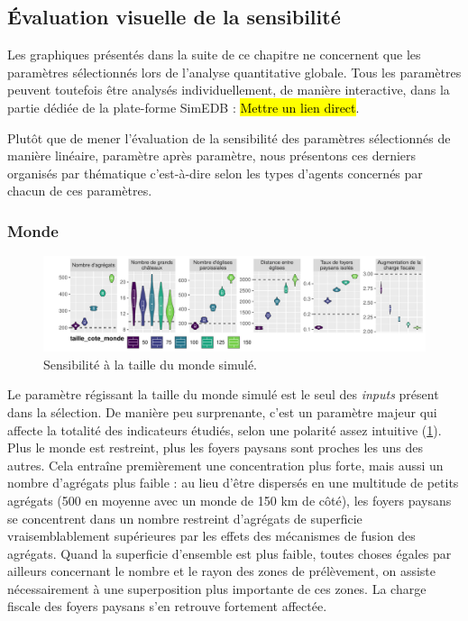 \subsection{Évaluation visuelle de la sensibilité}

\bigskip
\begin{mdframed}[backgroundcolor=black!5,footnoteinside=false]
	Les graphiques présentés dans la suite de ce chapitre ne concernent que les paramètres sélectionnés lors de l'analyse quantitative globale.
	Tous les paramètres peuvent toutefois être analysés individuellement, de manière interactive, dans la partie dédiée de la plate-forme SimEDB : \hl{Mettre un lien direct}.
\end{mdframed}

Plutôt que de mener l'évaluation de la sensibilité des paramètres sélectionnés de manière linéaire, paramètre après paramètre, nous présentons ces derniers organisés par thématique c'est-à-dire selon les types d'agents concernés par chacun de ces paramètres.

\subsubsection{Monde}

\begin{figure}[H]
	\centering
	\includegraphics[width=\linewidth]{img/sensib/sensibilite_taille_cote_monde.pdf}
	\caption{Sensibilité à la taille du monde simulé.}
	\label{fig:sensib-monde}
\end{figure}

Le paramètre régissant la taille du monde simulé est le seul des \textit{inputs} présent dans la sélection.
De manière peu surprenante, c'est un paramètre majeur qui affecte la totalité des indicateurs étudiés, selon une polarité assez intuitive (\cref{fig:sensib-monde}).
Plus le monde est restreint, plus les foyers paysans sont proches les uns des autres.
Cela entraîne premièrement une concentration plus forte, mais aussi un nombre d'agrégats plus faible : au lieu d'être dispersés en une multitude de petits agrégats (500 en moyenne avec un monde de 150 km de côté), les foyers paysans se concentrent dans un nombre restreint d'agrégats de superficie vraisemblablement supérieures par les effets des mécanismes de fusion des agrégats.
Quand la superficie d'ensemble est plus faible, toutes choses égales par ailleurs concernant le nombre et le rayon des zones de prélèvement, on assiste nécessairement à une superposition plus importante de ces zones.
La charge fiscale des foyers paysans s'en retrouve fortement affectée.


